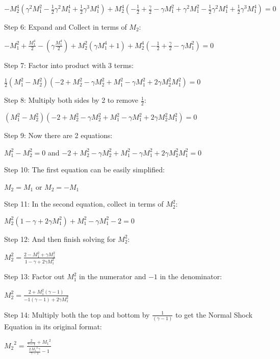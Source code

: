\documentclass{article}
\begin{document}
$- M_2^4 (\gamma^2 M_1^2 - \frac{1}{2} \gamma^2 M_1^4 + \frac{1}{2} \gamma^3 M_1^4) + M_2^4 \left(-\frac{1}{2} + \frac{\gamma}{2} - \gamma M_1^2 + \gamma^2 M_1^2 - \frac{1}{2} \gamma^2 M_1^4 + \frac{1}{2} \gamma^3 M_1^4\right) = 0$

Step 6: Expand and Collect in terms of $M_2$:


$-M_1^2 + \frac{M_1^4}{2} - \left(\gamma \frac{M_1^4}{2}\right) + M_2^2 (\gamma M_1^4 + 1) + M_2^4 \left(-\frac{1}{2} + \frac{\gamma}{2} - \gamma M_1^2\right) = 0$

Step 7: Factor into product with 3 terms:



$\frac{1}{2} \left(M_1^2 - M_2^2\right) \left(-2 + M_2^2 - \gamma M_2^2 + M_1^2 - \gamma M_1^2 + 2 \gamma M_2^2 M_1^2\right) = 0$

Step 8: Multiply both sides by 2 to remove $\frac{1}{2}$:

$\left(M_1^2 - M_2^2\right) \left(-2 + M_2^2 - \gamma M_2^2 + M_1^2 - \gamma M_1^2 + 2 \gamma M_2^2 M_1^2\right) = 0$

Step 9: Now there are 2 equations:

$M_1^2 - M_2^2 = 0$ \quad and \quad $-2 + M_2^2 - \gamma M_2^2 + M_1^2 - \gamma M_1^2 + 2 \gamma M_2^2 M_1^2 = 0$

Step 10: The first equation can be easily simplified:

$M_2 = M_1$ \quad or \quad $M_2 = -M_1$

Step 11: In the second equation, collect in terms of $M_2^2$:

$M_2^2 (1 - \gamma + 2 \gamma M_1^2) + M_1^2 - \gamma M_1^2 - 2 = 0$

Step 12: And then finish solving for $M_2^2$:

$M_2^2 = \frac{2 - M_1^2 + \gamma M_1^2}{1 - \gamma + 2 \gamma M_1^2}$

Step 13: Factor out $M_1^2$ in the numerator and $-1$ in the denominator:

$M_2^2 = \frac{2 + M_1^2 (\gamma - 1)}{-1 (\gamma - 1) + 2 \gamma M_1^2}$

Step 14: Multiply both the top and bottom by $\frac{1}{(\gamma - 1)}$ to get the Normal Shock Equation in its original format:

${M_2 }^2 = \frac{\frac{2}{\gamma -1}+{M_1 }^2 }{\frac{2\,{M_1 }^2 \,\gamma }{\gamma -1}-1}$
\end{document}
